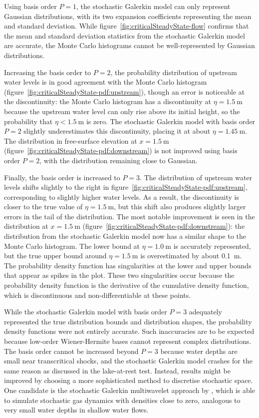 Using basis order $P=1$, the stochastic Galerkin model can only represent Gaussian distributions, with its two expansion coefficients representing the mean and standard deviation.
While figure~\ref{fig:criticalSteadyState-flow} confirms that the mean and standard deviation statistics from the stochastic Galerkin model are accurate, the Monte Carlo histograms cannot be well-represented by Gaussian distributions.

Increasing the basis order to $P=2$, the probability distribution of upstream water levels is in good agreement with the Monte Carlo histogram (figure~\ref{fig:criticalSteadyState-pdf:upstream}), though an error is noticeable at the discontinuity:
the Monte Carlo histogram has a discontinuity at $\eta = \SI{1.5}{\meter}$ because the upstream water level can only rise above its initial height, so the probability that $\eta < \SI{1.5}{\meter}$ is zero.
The stochastic Galerkin model with basis order $P = 2$ slightly underestimates this discontinuity, placing it at about $\eta = \SI{1.45}{\meter}$.
The distribution in free-surface elevation at $x = \SI{1.5}{\meter}$ (figure~\ref{fig:criticalSteadyState-pdf:downstream}) is not improved using basis order $P=2$, with the distribution remaining close to Gaussian.

Finally, the basis order is increased to $P=3$.
The distribution of upstream water levels shifts slightly to the right in figure~\ref{fig:criticalSteadyState-pdf:upstream}, corresponding to slightly higher water levels.
As a result, the discontinuity is closer to the true value of $\eta = \SI{1.5}{\meter}$, but this shift also produces slightly larger errors in the tail of the distribution.
The most notable improvement is seen in the distribution at $x = \SI{1.5}{\meter}$ (figure~\ref{fig:criticalSteadyState-pdf:downstream}):
the distribution from the stochastic Galerkin model now has a similar shape to the Monte Carlo histogram.
The lower bound at $\eta = \SI{1.0}{\meter}$ is accurately represented, but the true upper bound around $\eta = \SI{1.5}{\meter}$ is overestimated by about \SI{0.1}{\meter}.
The probability density function has singularities at the lower and upper bounds that appear as spikes in the plot.
These two singularities occur because the probability density function is the derivative of the cumulative density function, which is discontinuous and non-differentiable at these points.

While the stochastic Galerkin model with basis order $P=3$ adequately represented the true distribution bounds and distribution shapes, the probability density functions were not entirely accurate.
Such inaccuracies are to be expected because low-order Wiener-Hermite bases cannot represent complex distributions.
The basis order cannot be increased beyond $P=3$ because water depths are small near transcritical shocks, and the stochastic Galerkin model crashes for the same reason as discussed in the lake-at-rest test.
Instead, results might be improved by choosing a more sophisticated method to discretise stochastic space.
One candidate is the stochastic Galerkin multiwavelet approach by \citet{pettersson2014}, which is able to simulate stochastic gas dynamics with densities close to zero,  analogous to very small water depths in shallow water flows.

